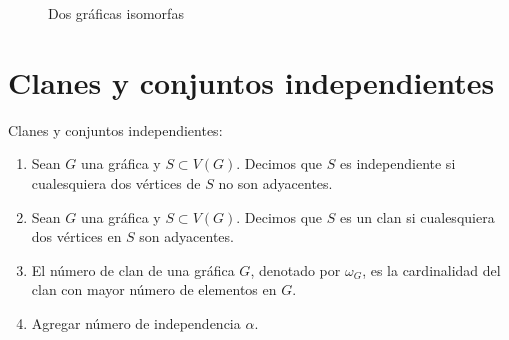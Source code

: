 \begin{figure}[ht]
    \centering
    \caption{Dos gr\'aficas isomorfas}
    \label{fig:isoGraf}
\end{figure}


\section{Clanes y conjuntos independientes}
\label{sec:clanes-CIndep}

\begin{definicion} Clanes y conjuntos independientes:
    \label{def:clanes y conjunto independiente}
    \begin{enumerate}
        \item Sean $G$ una gr\'afica y $S \subset V(G)$. Decimos que $S$ es
        independiente si cualesquiera dos v\'ertices de $S$ no son adyacentes.
        \item Sean $G$ una gr\'afica y $S \subset V(G)$. Decimos que $S$ es un
        clan si cualesquiera dos v\'ertices en $S$ son adyacentes.
        \item El n\'umero de clan de una gr\'afica $G$, denotado por $\omega_G$,
        es la cardinalidad del clan con mayor n\'umero de elementos en $G$.
        \item Agregar n\'umero de independencia $\alpha$.
    \end{enumerate}
\end{definicion}

